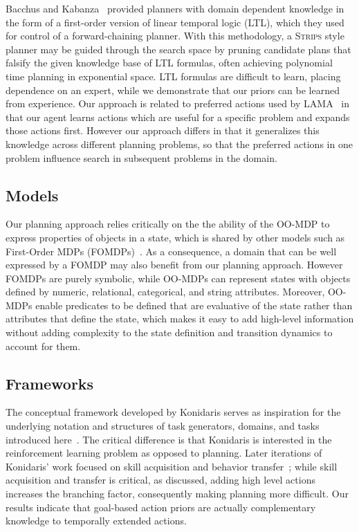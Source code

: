\documentclass[11pt]{article}
\begin{document}
Bacchus and
Kabanza~\cite{Bacchus95usingtemporal,Bacchus99usingtemporal} provided
planners with domain dependent knowledge in the form of a first-order
version of linear temporal logic (LTL), which they used for control of
a forward-chaining planner. With this methodology, a \textsc{Strips}
style planner may be guided through the search space by pruning
candidate plans that falsify the given knowledge base of LTL formulas,
often achieving polynomial time planning in exponential space.  LTL
formulas are difficult to learn, placing dependence on an expert,
while we demonstrate that our priors can be learned
from experience.
Our approach is related to preferred actions used by
LAMA~\cite{richter10} in that our agent learns actions which are
useful for a specific problem and expands those actions first.
However our approach differs in that it generalizes this knowledge
across different planning problems, so that the preferred actions in
one problem influence search in subsequent problems in the domain.

\subsection{Models}
Our planning approach relies critically on the the ability of the OO-MDP to express properties of objects in a state, which is shared by other models such as First-Order MDPs (FOMDPs)~\cite{boutilier2001symbolic}. As a consequence, a domain that can be well expressed by a FOMDP may also benefit from our planning approach. However FOMDPs are purely symbolic, while OO-MDPs can represent states with objects defined by numeric, relational, categorical, and string attributes. Moreover, OO-MDPs enable predicates to be defined that are evaluative of the state rather than attributes that define the state, which makes it easy to add high-level information without adding complexity to the state definition and transition dynamics to account for them.

\subsection{Frameworks}
The conceptual framework developed by Konidaris serves as inspiration for the underlying notation and structures of task generators, domains, and tasks introduced here~\cite{konidaris2006framework}. The critical difference is that Konidaris is interested in the reinforcement learning problem as opposed to planning. Later iterations of Konidaris' work focused on skill acquisition and behavior transfer~\cite{konidaris07}; while skill acquisition and transfer is critical, as discussed, adding high level actions increases the branching factor, consequently making planning more difficult. Our results indicate that goal-based action priors are actually complementary knowledge to temporally extended actions.
\end{document}
